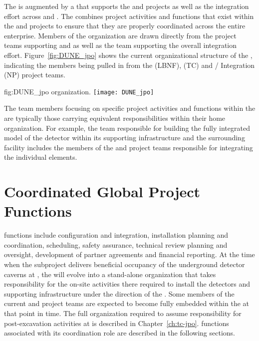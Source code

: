 The  is augmented by a  that supports the
 and  projects as well as the integration
effort across  and . The  combines
project activities and functions that exist within the  and 
projects to ensure that they are properly coordinated across the
entire enterprise.  Members of the  organization are drawn directly
from the project teams supporting  and  as well as the team
supporting the overall integration effort.  Figure~\ref{fig:DUNE_jpo} shows the
current organizational structure of the , indicating the members
being pulled in from the  (LBNF),  (TC) and /
Integration (NP) project teams.
\begin{dunefigure}{fig:DUNE_jpo}
  { organization.}
  \texttt{[image: DUNE\_jpo]}
\end{dunefigure}
The team members focusing on specific project activities and functions
within the  are typically those carrying equivalent
responsibilities within their home organization.  For example, the
 team responsible for building the fully integrated model
of the detector within its supporting infrastructure and the
surrounding facility includes the members of the  and
 project teams responsible for integrating the individual
elements.

\section{Coordinated Global Project Functions}
\label{sec:global_project}

 functions include  configuration and integration,
installation planning and coordination, scheduling, safety assurance,
technical review planning and oversight, development of partner
agreements and financial reporting.  At the time when the 
 subproject delivers beneficial occupancy of
the underground detector caverns at , the  will evolve into a
stand-alone organization that takes responsibility for the on-site
activities %
there required to install the detectors and supporting
infrastructure under the direction of the .
Some members of the current  and  project teams are
expected to become fully embedded within the  at that point in
time.  The full  organization required to assume responsibility for
post-excavation activities at  is described in Chapter~\ref{ch:tc-jpo}.
 functions associated with its  coordination role
are described in the following sections.

